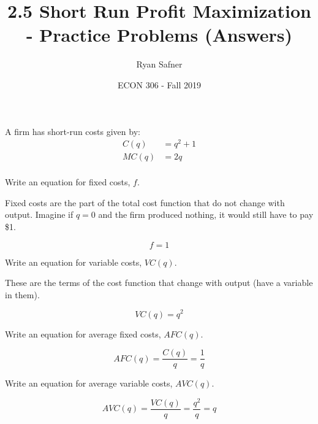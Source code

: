 \documentclass[12 pt]{exam}
\title{2.5 Short Run Profit Maximization - Practice Problems (Answers)}
\author{Ryan Safner}
\date{ECON 306 - Fall 2019}
\begin{document}
\maketitle

A firm has short-run costs given by:
$$\begin{aligned}
C(q)&=q^2+1\\
MC(q)&=2q\\ \end{aligned}$$

\begin{questions}

\question Write an equation for fixed costs, $f$.

\begin{solution}
Fixed costs are the part of the total cost function that do not change with output. Imagine if $q=0$ and the firm produced nothing, it would still have to pay \$1. 

\begin{equation*}
f=1	
\end{equation*}
\end{solution}

\question Write an equation for variable costs, $VC(q)$.

\begin{solution}

These are the terms of the cost function that change with output (have a variable in them). 

\begin{equation*}
VC(q)=q^2 	
\end{equation*}

\end{solution}

\question Write an equation for average fixed costs, $AFC(q)$.

\begin{solution}
\begin{equation*}
AFC(q)=\frac{C(q)}{q}=\frac{1}{q} 	
\end{equation*}

\end{solution}

\question Write an equation for average variable costs, $AVC(q)$.

\begin{solution}

\begin{equation*}
AVC(q)=\frac{VC(q)}{q}=\frac{q^2}{q} = q
\end{equation*}


\end{solution}
\end{questions}
\end{document}
